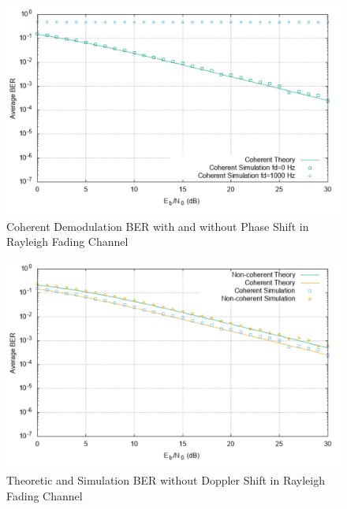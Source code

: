 \documentclass[technicalreport]{ieicej}
\begin{document}
\begin{figure}[tbp]
	\begin{center}
		\vspace{0cm}
		\includegraphics[width=\linewidth,clip]{fig/r_coherent.pdf}
		\caption{Coherent Demodulation BER with and without Phase Shift in Rayleigh Fading Channel}
		\label{fig:sample}
	\end{center}
\end{figure}

\begin{figure}[tbp]
	\begin{center}
		\vspace{0cm}
		\includegraphics[width=\linewidth,clip]{fig/without_fd.pdf}
		\caption{Theoretic and Simulation BER without Doppler Shift in Rayleigh Fading Channel}
		\label{fig:sample}
	\end{center}
\end{figure}
\end{document}
